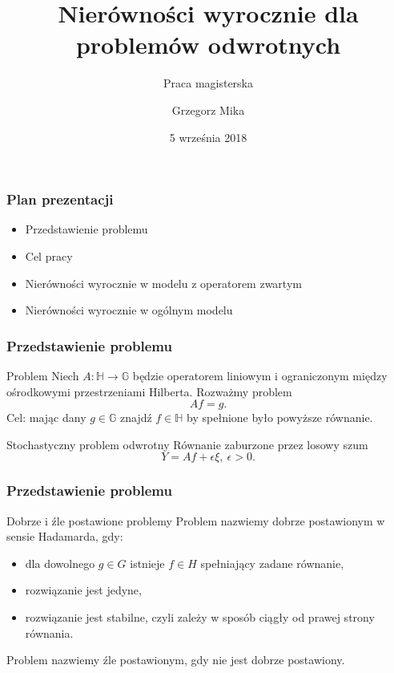 \documentclass{beamer}
\title{Nierówności wyrocznie dla problemów odwrotnych}
\subtitle{Praca magisterska}
\author{Grzegorz Mika}
\institute{Wydział Matematyki Stosowanej}
\date{5 września 2018}
\begin{document}
\titleframe[pl]

\begin{frame}\frametitle{Plan prezentacji}
\begin{itemize}
\item Przedstawienie problemu 
\vspace{3mm}
\item Cel pracy
\vspace{3mm}
\item Nierówności wyrocznie w modelu z operatorem zwartym
\vspace{3mm}
\item Nierówności wyrocznie w ogólnym modelu
\end{itemize}
\end{frame}

\begin{frame}\frametitle{Przedstawienie problemu}
\begin{block}{Problem}
Niech $A\colon \mathbb{H}\to \mathbb{G}$ będzie operatorem liniowym i ograniczonym między ośrodkowymi przestrzeniami Hilberta. Rozważmy problem
\begin{displaymath}
Af = g.
\end{displaymath}
Cel: mając dany $g \in \mathbb{G}$ znajdź $f \in \mathbb{H}$  by spełnione było powyższe równanie.
\end{block}
\begin{block}{Stochastyczny problem odwrotny}
Równanie zaburzone przez losowy szum
\begin{displaymath}
Y = Af + \epsilon\xi,\ \epsilon > 0.
\end{displaymath}
\end{block}
\end{frame}

\begin{frame}\frametitle{Przedstawienie problemu}
\begin{block}{Dobrze i źle postawione problemy}
Problem nazwiemy dobrze postawionym w sensie Hadamarda, gdy:
\begin{itemize}
\item dla dowolnego $g\in G$ istnieje $f\in H$ spełniający zadane równanie,
\item rozwiązanie jest jedyne,
\item rozwiązanie jest stabilne, czyli zależy w sposób ciągły od prawej strony równania.
\end{itemize}
Problem nazwiemy źle postawionym, gdy nie jest dobrze postawiony.
\end{block}
\end{frame}
\end{document}
